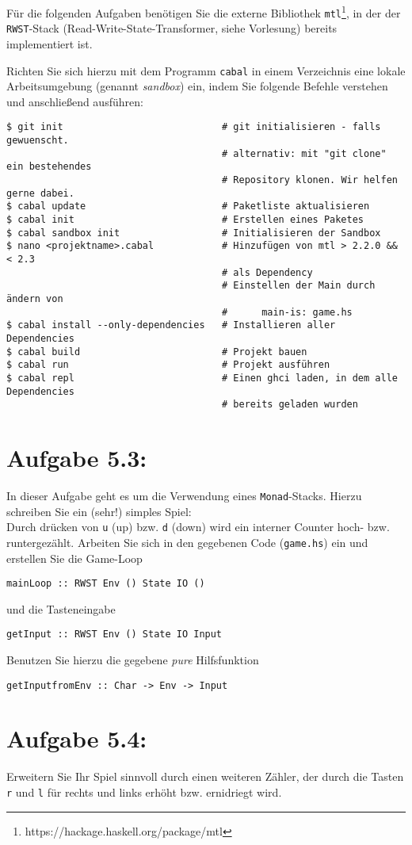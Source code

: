 \documentclass[a4paper,10pt]{scrartcl}
\newcommand{\theuebungszettel}{5}
\begin{document}
Für die folgenden Aufgaben benötigen Sie die externe Bibliothek \texttt{mtl}\footnote{https://hackage.haskell.org/package/mtl}, in der der \texttt{RWST}-Stack (Read-Write-State-Transformer, siehe Vorlesung) bereits implementiert ist.\bigskip

Richten Sie sich hierzu mit dem Programm \texttt{cabal} in einem Verzeichnis eine lokale Arbeitsumgebung (genannt \emph{sandbox}) ein, indem Sie folgende Befehle verstehen und anschließend ausführen:
\begin{verbatim}
$ git init                            # git initialisieren - falls gewuenscht.
                                      # alternativ: mit "git clone" ein bestehendes
                                      # Repository klonen. Wir helfen gerne dabei.
$ cabal update                        # Paketliste aktualisieren
$ cabal init                          # Erstellen eines Paketes
$ cabal sandbox init                  # Initialisieren der Sandbox
$ nano <projektname>.cabal            # Hinzufügen von mtl > 2.2.0 && < 2.3
                                      # als Dependency
                                      # Einstellen der Main durch ändern von
                                      #      main-is: game.hs
$ cabal install --only-dependencies   # Installieren aller Dependencies
$ cabal build                         # Projekt bauen
$ cabal run                           # Projekt ausführen
$ cabal repl                          # Einen ghci laden, in dem alle Dependencies
                                      # bereits geladen wurden
\end{verbatim}

\section*{Aufgabe \theuebungszettel.3:}
In dieser Aufgabe geht es um die Verwendung eines \texttt{Monad}-Stacks. Hierzu schreiben Sie ein (sehr!) simples Spiel:\\
Durch drücken von \texttt{u} (up) bzw. \texttt{d} (down) wird ein interner Counter hoch- bzw. runtergezählt. Arbeiten Sie sich in den gegebenen Code (\texttt{game.hs}) ein und erstellen Sie die Game-Loop
\begin{verbatim}
mainLoop :: RWST Env () State IO ()
\end{verbatim}
und die Tasteneingabe
\begin{verbatim}
getInput :: RWST Env () State IO Input
\end{verbatim}
Benutzen Sie hierzu die gegebene \emph{pure} Hilfsfunktion
\begin{verbatim}
getInputfromEnv :: Char -> Env -> Input
\end{verbatim}
\section*{Aufgabe \theuebungszettel.4:}
Erweitern Sie Ihr Spiel sinnvoll durch einen weiteren Zähler, der durch die Tasten \texttt{r} und \texttt{l} für rechts und links erhöht bzw. ernidriegt wird.
\end{document}

